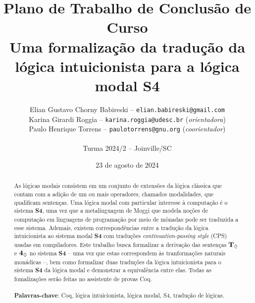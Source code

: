 \title{
Plano de Trabalho de Conclusão de Curso\\
Uma formalização da tradução da lógica intuicionista para a lógica modal S4
}

\author{
Elian Gustavo Chorny Babireski -- \texttt{elian.babireski@gmail.com}\\
Karina Girardi Roggia -- \texttt{karina.roggia@udesc.br} {(\textit{orientadora})}\\
Paulo Henrique Torrens -- \texttt{paulotorrens@gnu.org} {(\textit{coorientador})}\\
~\\
Turma 2024/2 -- Joinville/SC
}

\date{23 de agosto de 2024}

\maketitle

\onehalfspacing  %

\begin{abstract}
As lógicas modais consistem em um conjunto de extensões da lógica clássica que contam com a adição de um ou mais operadores, chamados modalidades, que qualificam sentenças. Uma lógica modal com particular interesse à computação é o sistema \textbf{S4}, uma vez que a metalinguagem de Moggi que modela noções de computação em linguagens de programação por meio de mônadas pode ser traduzida a esse sistema. Ademais, existem correspondências entre a tradução da lógica intuicionista ao sistema modal \textbf{S4} com traduções \textit{continuation-passing style} (CPS) usadas em compiladores. Este trabalho busca formalizar a derivação das sentenças $\boldsymbol{\text{\textbf{T}}_\Diamond}$ e $\boldsymbol{\text{\textbf{4}}_\Diamond}$ no sistema \textbf{S4} -- uma vez que estas correspondem às tranformações naturais monádicas --, bem como formalizar duas traduções da lógica intuicionista para o sistema \textbf{S4} da lógica modal e demonstrar a equivalência entre elas. Todas as fomalizações serão feitas no assistente de provas Coq. \\\\
\textbf{Palavras-chave}: Coq, lógica intuicionista, lógica modal, S4, tradução de lógicas.
\end{abstract}
